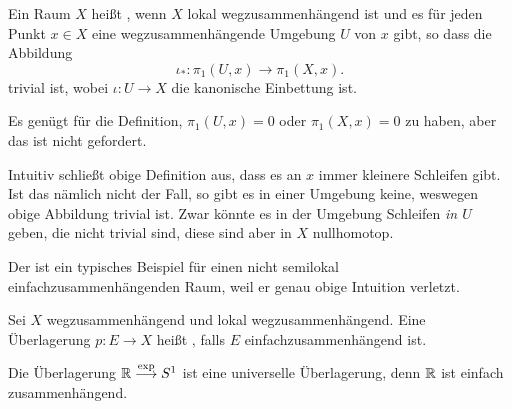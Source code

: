 \begin{definition}\label{def:semilokal-einfachzusammenhängend}
    Ein Raum $X$ heißt  , wenn $X$ lokal wegzusammenhängend ist und es für jeden Punkt  $x\in X$ eine wegzusammenhängende Umgebung $U$ von  $x$ gibt, so dass die Abbildung
    \[
        ι_* \colon  \pi_1(U,x) \to  \pi_1(X,x)
    .\] 
    trivial ist, wobei $ι\colon  U \to  X$ die kanonische Einbettung ist.
\end{definition}

\begin{remark}
    Es genügt für die Definition, $\pi_1(U,x) = 0$ oder $\pi_1(X,x) = 0$ zu haben, aber das ist nicht gefordert.
\end{remark}

\begin{example}
    Intuitiv schließt obige Definition aus, dass es an $x$ immer kleinere Schleifen gibt. Ist das nämlich nicht der Fall, so gibt es in einer Umgebung keine, weswegen obige Abbildung trivial ist. Zwar könnte es in der Umgebung Schleifen  \textit{in $U$} geben, die nicht trivial sind, diese sind aber in $X$ nullhomotop.

    Der  ist ein typisches Beispiel für einen nicht semilokal einfachzusammenhängenden Raum, weil er genau obige Intuition verletzt.

    \begin{minipage}{\textwidth}
        \centering
    \end{minipage}
\end{example}

\begin{definition}\label{def:universelle-überlagerung}
    Sei $X$ wegzusammenhängend und lokal wegzusammenhängend. Eine Überlagerung  $p\colon  E \to X$ heißt , falls $E$ einfachzusammenhängend ist. 
\end{definition}

\begin{example}
    Die Überlagerung  $\mathbb{R} \stackrel{\exp }{\longrightarrow} S^1$ ist eine universelle Überlagerung, denn $\mathbb{R}$ ist einfach zusammenhängend.
\end{example}


